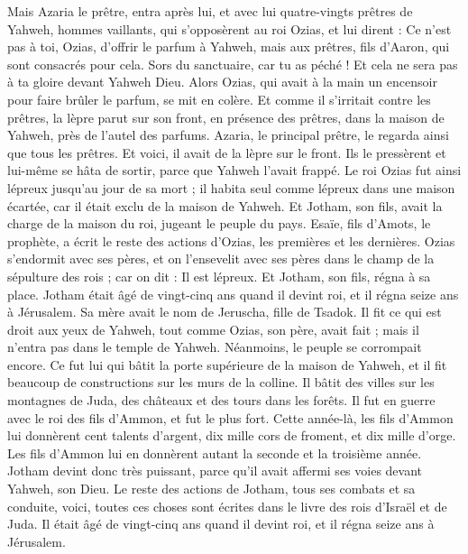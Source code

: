 \begin{multicols}{2}
Mais Azaria le prêtre, entra après lui, et avec lui quatre-vingts prêtres de Yahweh, hommes vaillants,
qui s'opposèrent au roi Ozias, et lui dirent : Ce n'est pas à toi, Ozias, d'offrir le parfum à Yahweh, mais aux prêtres, fils d'Aaron, qui sont consacrés pour cela. Sors du sanctuaire, car tu as péché ! Et cela ne sera pas à ta gloire devant Yahweh Dieu.
Alors Ozias, qui avait à la main un encensoir pour faire brûler le parfum, se mit en colère. Et comme il s'irritait contre les prêtres, la lèpre parut sur son front, en présence des prêtres, dans la maison de Yahweh, près de l'autel des parfums.
Azaria, le principal prêtre, le regarda ainsi que tous les prêtres. Et voici, il avait de la lèpre sur le front. Ils le pressèrent et lui-même se hâta de sortir, parce que Yahweh l'avait frappé.
Le roi Ozias fut ainsi lépreux jusqu'au jour de sa mort ; il habita seul comme lépreux dans une maison écartée, car il était exclu de la maison de Yahweh. Et Jotham, son fils, avait la charge de la maison du roi, jugeant le peuple du pays.
Esaïe, fils d'Amots, le prophète, a écrit le reste des actions d'Ozias, les premières et les dernières.
Ozias s'endormit avec ses pères, et on l'ensevelit avec ses pères dans le champ de la sépulture des rois ; car on dit : Il est lépreux. Et Jotham, son fils, régna à sa place.
\VerseOne{}Jotham était âgé de vingt-cinq ans quand il devint roi, et il régna seize ans à Jérusalem. Sa mère avait le nom de Jeruscha, fille de Tsadok.
Il fit ce qui est droit aux yeux de Yahweh, tout comme Ozias, son père, avait fait ; mais il n'entra pas dans le temple de Yahweh. Néanmoins, le peuple se corrompait encore.
Ce fut lui qui bâtit la porte supérieure de la maison de Yahweh, et il fit beaucoup de constructions sur les murs de la colline.
Il bâtit des villes sur les montagnes de Juda, des châteaux et des tours dans les forêts.
Il fut en guerre avec le roi des fils d'Ammon, et fut le plus fort. Cette année-là, les fils d'Ammon lui donnèrent cent talents d'argent, dix mille cors de froment, et dix mille d'orge. Les fils d'Ammon lui en donnèrent autant la seconde et la troisième année.
Jotham devint donc très puissant, parce qu'il avait affermi ses voies devant Yahweh, son Dieu.
Le reste des actions de Jotham, tous ses combats et sa conduite, voici, toutes ces choses sont écrites dans le livre des rois d'Israël et de Juda.
Il était âgé de vingt-cinq ans quand il devint roi, et il régna seize ans à Jérusalem.

\end{multicols}
